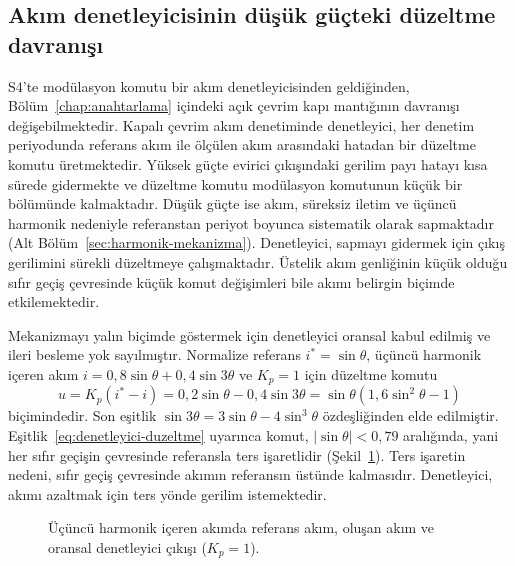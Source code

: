 \subsection{Akım denetleyicisinin düşük güçteki düzeltme davranışı}
\label{sec:denetleyici-duzeltme}

S4'te modülasyon komutu bir akım denetleyicisinden geldiğinden, Bölüm~\ref{chap:anahtarlama} içindeki açık çevrim kapı mantığının davranışı değişebilmektedir. Kapalı çevrim akım denetiminde denetleyici, her denetim periyodunda referans akım ile ölçülen akım arasındaki hatadan bir düzeltme komutu üretmektedir. Yüksek güçte evirici çıkışındaki gerilim payı hatayı kısa sürede gidermekte ve düzeltme komutu modülasyon komutunun küçük bir bölümünde kalmaktadır. Düşük güçte ise akım, süreksiz iletim ve üçüncü harmonik nedeniyle referanstan periyot boyunca sistematik olarak sapmaktadır (Alt Bölüm~\ref{sec:harmonik-mekanizma}). Denetleyici, sapmayı gidermek için çıkış gerilimini sürekli düzeltmeye çalışmaktadır. Üstelik akım genliğinin küçük olduğu sıfır geçiş çevresinde küçük komut değişimleri bile akımı belirgin biçimde etkilemektedir.

Mekanizmayı yalın biçimde göstermek için denetleyici oransal kabul edilmiş ve ileri besleme yok sayılmıştır. Normalize referans $i^{\ast}=\sin\theta$, üçüncü harmonik içeren akım $i=0{,}8\sin\theta+0{,}4\sin3\theta$ ve $K_p=1$ için düzeltme komutu
\begin{equation}
  u=K_p\left(i^{\ast}-i\right)=0{,}2\sin\theta-0{,}4\sin3\theta=\sin\theta\left(1{,}6\sin^2\theta-1\right)
  \label{eq:denetleyici-duzeltme}
\end{equation}
biçimindedir. Son eşitlik $\sin3\theta=3\sin\theta-4\sin^3\theta$ özdeşliğinden elde edilmiştir. Eşitlik~\eqref{eq:denetleyici-duzeltme} uyarınca komut, $|\sin\theta|<0{,}79$ aralığında, yani her sıfır geçişin çevresinde referansla ters işaretlidir (Şekil~\ref{fig:denetleyici-duzeltme-akim}). Ters işaretin nedeni, sıfır geçiş çevresinde akımın referansın üstünde kalmasıdır. Denetleyici, akımı azaltmak için ters yönde gerilim istemektedir.

\begin{figure}[H]
  \centering
  
  \caption{Üçüncü harmonik içeren akımda referans akım, oluşan akım ve oransal denetleyici çıkışı ($K_p=1$).}
  \label{fig:denetleyici-duzeltme-akim}
\end{figure}

